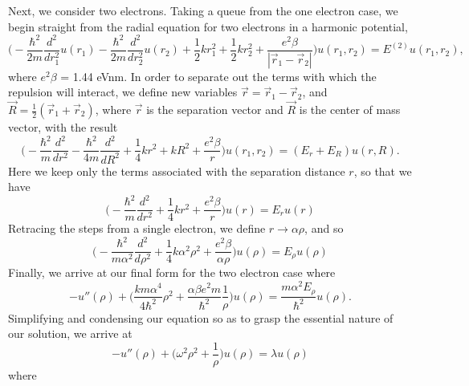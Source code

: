\documentclass[11pt,a4paper]{article}
\begin{document}
Next, we consider two electrons. Taking a queue from the one electron case, we begin straight from the radial equation for two electrons in a harmonic potential,
\begin{equation}
\bigg(-\frac{\hbar^2}{2m}\frac{d^2}{dr_1^2}u(r_1) - \frac{\hbar^2}{2m}\frac{d^2}{dr_2^2}u(r_2) + \frac{1}{2}kr_1^2 + \frac{1}{2}kr_2^2 + \frac{e^2\beta}{|\vec{r}_1 - \vec{r}_2|}\bigg)u(r_1,r_2) = E^{(2)}u(r_1,r_2),
\end{equation}
where $e^2\beta$ = 1.44 eVnm. In order to separate out the terms with which the repulsion will interact, we define new variables $\vec{r} = \vec{r}_1 - \vec{r}_2$, and $\vec{R} = \frac{1}{2}(\vec{r}_1 + \vec{r}_2)$, where $\vec{r}$ is the separation vector and $\vec{R}$ is the center of mass vector, with the result 
\begin{equation}
\bigg(-\frac{\hbar^2}{m}\frac{d^2}{dr^2} - \frac{\hbar^2}{4m}\frac{d^2}{dR^2} + \frac{1}{4}kr^2 + kR^2 + \frac{e^2\beta}{r}\bigg)u(r_1,r_2) = (E_r + E_R)u(r,R).
\end{equation}
Here we keep only the terms associated with the separation distance $r$, so that we have 
\begin{equation}
\bigg(-\frac{\hbar^2}{m}\frac{d^2}{dr^2} + \frac{1}{4}kr^2 + \frac{e^2\beta}{r}\bigg)u(r) = E_ru(r)
\end{equation}
Retracing the steps from a single electron, we define $r \rightarrow \alpha\rho$, and so
\begin{equation}
\bigg(-\frac{\hbar^2}{m\alpha^2}\frac{d^2}{d\rho^2} + \frac{1}{4}k\alpha^2\rho^2 + \frac{e^2\beta}{\alpha\rho}\bigg)u(\rho) = E_{\rho}u(\rho)
\end{equation}
Finally, we arrive at our final form for the two electron case where
\begin{equation}
-u''(\rho) + \bigg(\frac{km\alpha^4}{4\hbar^2}\rho^2 + \frac{\alpha\beta e^2m}{\hbar^2}\frac{1}{\rho}\bigg)u(\rho) = \frac{m\alpha^2E_{\rho}}{\hbar^2}u(\rho).
\end{equation}
Simplifying and condensing our equation so as to grasp the essential nature of our solution, we arrive at
\begin{equation}
\boxed{-u''(\rho) + \bigg(\omega^2\rho^2 + \frac{1}{\rho}\bigg)u(\rho) = \lambda u(\rho)}
\end{equation}
where
\end{document}
